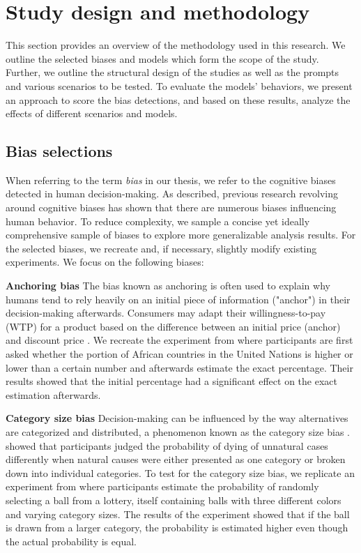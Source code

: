 \section{Study design and methodology}
\label{chapter:methodology}

\par This section provides an overview of the methodology used in this research. We outline the selected biases and models which form the scope of the study. Further, we outline the structural design of the studies as well as the prompts and various scenarios to be tested. To evaluate the models' behaviors, we present an approach to score the bias detections, and based on these results, analyze the effects of different scenarios and models.


\subsection{Bias selections}
\par When referring to the term \textit{bias} in our thesis, we refer to the cognitive biases detected in human decision-making. As described, previous research revolving around cognitive biases has shown that there are numerous biases influencing human behavior. To reduce complexity, we sample a concise yet ideally comprehensive sample of biases to explore more generalizable analysis results. For the selected biases, we recreate and, if necessary, slightly modify existing experiments. We focus on the following biases:

\setlength{\parindent}{20pt}
\par \textbf{Anchoring bias} The bias known as anchoring is often used to explain why humans tend to rely heavily on an initial piece of information ("anchor") in their decision-making afterwards. Consumers may adapt their willingness-to-pay (WTP) for a product based on the difference between an initial price (anchor) and discount price \parencite{chandrashekaran2006anchoring}. We recreate the experiment from \textcite{tversky1974judgment} where participants are first asked whether the portion of African countries in the United Nations is higher or lower than a certain number and afterwards estimate the exact percentage. Their results showed that the initial percentage had a significant effect on the exact estimation afterwards.

\par \textbf{Category size bias} Decision-making can be influenced by the way alternatives are categorized and distributed, a phenomenon known as the category size bias \parencite{isaac2014judging}. \textcite{tversky1994support} showed that participants judged the probability of dying of unnatural cases differently when natural causes were either presented as one category or broken down into individual categories. To test for the category size bias, we replicate an experiment from \textcite{isaac2014judging} where participants estimate the probability of randomly selecting a ball from a lottery, itself containing balls with three different colors and varying category sizes. The results of the experiment showed that if the ball is drawn from a larger category, the probability is estimated higher even though the actual probability is equal.

